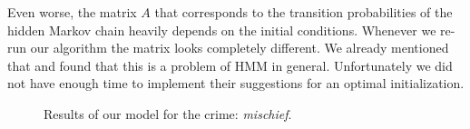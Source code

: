 \documentclass{article}
\begin{document}
\normalsize
Even worse, the matrix $A$ that corresponds to the transition probabilities of the hidden Markov chain heavily depends on the initial conditions. Whenever we re-run our algorithm the matrix looks completely different. We already mentioned that \cite{in1} and \cite{in2} found that this is a problem of HMM in general. Unfortunately we did not have enough time to implement their suggestions for an optimal initialization. 


\begin{figure}
\centering    
{}
\caption{Results of our model for the crime: \emph{mischief}.}
\label{mischief}
\end{figure}
\end{document}
